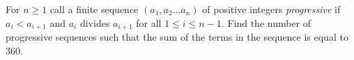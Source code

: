 For $n \ge 1$ call a finite sequence $(a_1, a_2 \ldots a_n)$ of positive integers \textit{progressive} if $a_i < a_{i+1}$ and $a_i$ divides $a_{i+1}$ for all $1 \le i \le n-1$. Find the number of progressive sequences such that the sum of the terms in the sequence is equal to $360$.